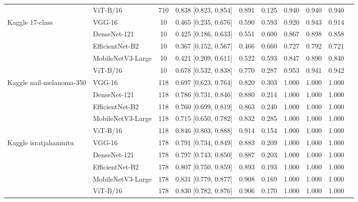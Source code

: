 \begin{table}[!tbp]
\begin{tabular}{llcclccccc}
 & ViT-B/16 & 710 & 0.838 [0.823, 0.854] & 0.891 & 0.125 & 0.940 & 0.940 & 0.940 \\
Kaggle 17-class & VGG-16 & 10 & 0.465 [0.235, 0.676] & 0.590 & 0.593 & 0.920 & 0.943 & 0.914 \\
 & DenseNet-121 & 10 & 0.425 [0.186, 0.633] & 0.551 & 0.600 & 0.867 & 0.898 & 0.858 \\
 & EfficientNet-B2 & 10 & 0.367 [0.152, 0.567] & 0.466 & 0.660 & 0.727 & 0.792 & 0.721 \\
 & MobileNetV3-Large & 10 & 0.421 [0.209, 0.611] & 0.522 & 0.593 & 0.847 & 0.890 & 0.840 \\
 & ViT-B/16 & 10 & 0.678 [0.532, 0.838] & 0.770 & 0.287 & 0.953 & 0.941 & 0.942 \\
Kaggle nail-melanoma-350 & VGG-16 & 118 & 0.697 [0.623, 0.764] & 0.820 & 0.303 & 1.000 & 1.000 & 1.000 \\
 & DenseNet-121 & 118 & 0.786 [0.731, 0.846] & 0.880 & 0.214 & 1.000 & 1.000 & 1.000 \\
 & EfficientNet-B2 & 118 & 0.760 [0.699, 0.819] & 0.863 & 0.240 & 1.000 & 1.000 & 1.000 \\
 & MobileNetV3-Large & 118 & 0.715 [0.650, 0.782] & 0.832 & 0.285 & 1.000 & 1.000 & 1.000 \\
 & ViT-B/16 & 118 & 0.846 [0.803, 0.888] & 0.914 & 0.154 & 1.000 & 1.000 & 1.000 \\
Kaggle isratjahanmitu & VGG-16 & 178 & 0.791 [0.734, 0.849] & 0.883 & 0.209 & 1.000 & 1.000 & 1.000 \\
 & DenseNet-121 & 178 & 0.797 [0.743, 0.850] & 0.887 & 0.203 & 1.000 & 1.000 & 1.000 \\
 & EfficientNet-B2 & 178 & 0.807 [0.750, 0.859] & 0.893 & 0.193 & 1.000 & 1.000 & 1.000 \\
 & MobileNetV3-Large & 178 & 0.831 [0.779, 0.877] & 0.908 & 0.169 & 1.000 & 1.000 & 1.000 \\
 & ViT-B/16 & 178 & 0.830 [0.782, 0.876] & 0.906 & 0.170 & 1.000 & 1.000 & 1.000 \\
\hline
\end{tabular}
\end{table}